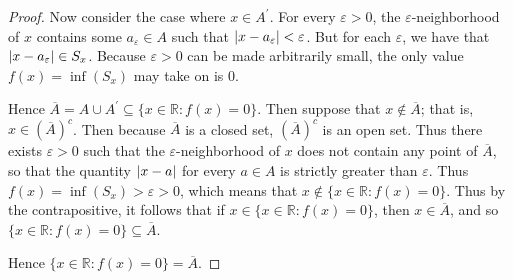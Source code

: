 \documentclass[12pt]{amsart}
\begin{document}
\begin{proof}
    Now consider the case where $x\in A^{\prime}$. For every $\varepsilon>0$, the $\varepsilon$-neighborhood of $x$ contains some $a_{\varepsilon}\in A$ such that $\abs{x-a_{\varepsilon}} < \varepsilon$. But for each $\varepsilon$, we have that $\abs{x-a_{\varepsilon}}\in S_x$. Because $\varepsilon>0$ can be made arbitrarily small, the only value $f(x) = \inf(S_x)$ may take on is $0$.

    Hence $\overline{A} = A\cup A^{\prime}\subseteq \{x\in \mathbb{R}:f(x)=0\}$. Then suppose that $x\not\in \overline{A}$; that is, $x\in (\overline{A})^c$. Then because $\overline{A}$ is a closed set, $(\overline{A})^c$ is an open set. Thus there exists $\varepsilon >0$ such that the $\varepsilon$-neighborhood of $x$ does not contain any point of $\overline{A}$, so that the quantity $\abs{x-a}$ for every $a\in A$ is strictly greater than $\varepsilon$. Thus $f(x) = \inf(S_x) > \varepsilon >0$, which means that $x\not\in \{x\in \mathbb{R}:f(x)=0\}$. Thus by the contrapositive, it follows that if $x\in \{x\in \mathbb{R}:f(x)=0\}$, then $x\in \overline{A}$, and so $\{x\in \mathbb{R}:f(x)=0\}\subseteq \overline{A}$.

    Hence $\{x\in \mathbb{R}:f(x)=0\} = \overline{A}$.
\end{proof}
\end{document}

